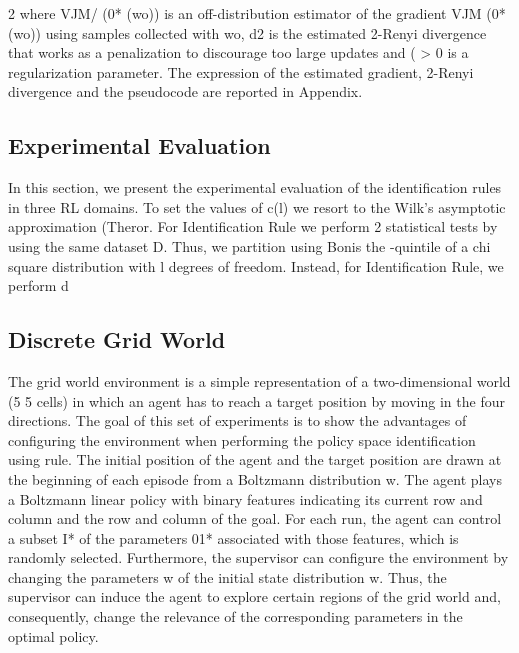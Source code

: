 \documentclass{article}
\begin{document}
\begin{paracol}{2}
where VJM/ (0* (wo)) is an off-distribution estimator of
the gradient VJM (0* (wo)) using samples collected with
wo, d2 is the estimated 2-Renyi divergence that works as
a penalization to discourage too large updates and ( > 0
is a regularization parameter. The expression of the estimated gradient, 2-Renyi divergence and the pseudocode are
reported in Appendix.


\subsection*{Experimental Evaluation}


In this section, we present the experimental evaluation of the
identification rules in three RL domains. To set the values of
c(l) we resort to the Wilk's asymptotic approximation (Theror. For Identification Rule we perform 2 statistical tests by
using the same dataset D. Thus, we partition  using Bonis the -quintile of a chi square distribution with l degrees
of freedom. Instead, for Identification Rule, we perform d


\subsection*{Discrete Grid World}


The grid world environment is a simple representation of a
two-dimensional world (5  5 cells) in which an agent has to
reach a target position by moving in the four directions. The
goal of this set of experiments is to show the advantages
of configuring the environment when performing the policy space identification using rule. The initial position of the
agent and the target position are drawn at the beginning of
each episode from a Boltzmann distribution w. The agent
plays a Boltzmann linear policy  with binary features  indicating its current row and column and the row and column
of the goal. For each run, the agent can control a subset I*
of the parameters 01* associated with those features, which
is randomly selected. Furthermore, the supervisor can configure the environment by changing the parameters w of the
initial state distribution w. Thus, the supervisor can induce
the agent to explore certain regions of the grid world and,
consequently, change the relevance of the corresponding parameters in the optimal policy.

\switchcolumn
\RaggedRight


\end{paracol}
\end{document}
